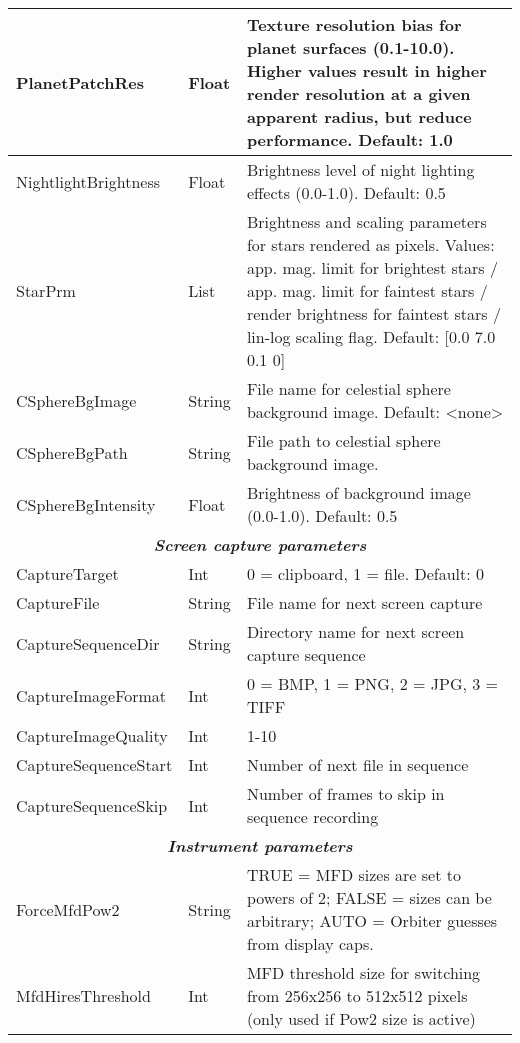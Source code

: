 \documentclass[Orbiter User Manual.tex]{subfiles}
\begin{document}
\begin{longtable}{ |p{}|p{}|p{}| }
	\hline\rule{0pt}{2ex}
	PlanetPatchRes & Float & Texture resolution bias for planet surfaces (0.1-10.0). Higher values result in higher render resolution at a given apparent radius, but reduce performance. Default: 1.0\\
	\hline\rule{0pt}{2ex}
	NightlightBrightness & Float & Brightness level of night lighting effects (0.0-1.0). Default: 0.5\\
	\hline\rule{0pt}{2ex}
	StarPrm & List & Brightness and scaling parameters for stars rendered as pixels. Values: app. mag. limit for brightest stars / app. mag. limit for faintest stars / render brightness for faintest stars / lin-log scaling flag. Default: [0.0 7.0 0.1 0]\\
	\hline\rule{0pt}{2ex}
	CSphereBgImage & String & File name for celestial sphere background image. Default: <none>\\
	\hline\rule{0pt}{2ex}
	CSphereBgPath & String & File path to celestial sphere background image.\\
	\hline\rule{0pt}{2ex}
	CSphereBgIntensity & Float & Brightness of background image (0.0-1.0). Default: 0.5\\
	\hline
	\multicolumn{3}{|c|}{\rule{0pt}{2ex}\textbf{\textit{Screen capture parameters}}}\\
	\hline\rule{0pt}{2ex}
	CaptureTarget & Int & 0 = clipboard, 1 = file. Default: 0\\
	\hline\rule{0pt}{2ex}
	CaptureFile & String & File name for next screen capture\\
	\hline\rule{0pt}{2ex}
	CaptureSequenceDir & String & Directory name for next screen capture sequence\\
	\hline\rule{0pt}{2ex}
	CaptureImageFormat & Int & 0 = BMP, 1 = PNG, 2 = JPG, 3 = TIFF\\
	\hline\rule{0pt}{2ex}
	CaptureImageQuality & Int & 1-10\\
	\hline\rule{0pt}{2ex}
	CaptureSequenceStart & Int & Number of next file in sequence\\
	\hline\rule{0pt}{2ex}
	CaptureSequenceSkip & Int & Number of frames to skip in sequence recording\\
	\hline
	\multicolumn{3}{|c|}{\rule{0pt}{2ex}\textbf{\textit{Instrument parameters}}}\\
	\hline\rule{0pt}{2ex}
	ForceMfdPow2 & String & TRUE = MFD sizes are set to powers of 2; FALSE = sizes can be arbitrary; AUTO = Orbiter guesses from display caps.\\
	\hline\rule{0pt}{2ex}
	MfdHiresThreshold & Int & MFD threshold size for switching from 256x256 to 512x512 pixels (only used if Pow2 size is active)\\

\end{longtable}
\end{document}
